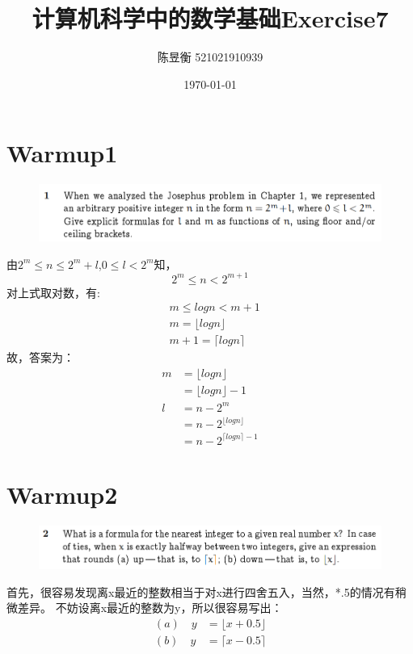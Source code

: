 \documentclass[]{article}
\title{计算机科学中的数学基础Exercise7}
\author{陈昱衡 521021910939}
\date{\today}
\begin{document}
\maketitle

\section*{Warmup1}
\begin{figure}[H]
\includegraphics[scale = 1]{Q1.png}
\end{figure}
由$2^m \le n \le 2^m + l$,$0 \le l < 2^m$知，
\begin{equation}
    2^m \le n < 2^{m+1}
\end{equation}
对上式取对数，有:
\begin{align}
    &m \le logn < m+1\\
    &m = \lfloor logn \rfloor \\
    &m + 1 =\lceil logn \rceil 
\end{align}
故，答案为：
\begin{align}
    m &= \lfloor logn \rfloor \\
        &= \lfloor logn \rfloor - 1\\
    l &= n - 2^m\\
        &= n - 2^{\lfloor logn \rfloor}\\
        &= n - 2^{\lceil logn \rceil - 1}
\end{align}



\section*{Warmup2}
\begin{figure}[H]
\includegraphics[scale = 1]{Q2.png}
\end{figure}
首先，很容易发现离x最近的整数相当于对x进行四舍五入，当然，*.5的情况有稍微差异。
不妨设离x最近的整数为y，所以很容易写出：
\begin{align}
    (a) \quad y &= \lfloor x+0.5 \rfloor\\
    (b) \quad y &= \lceil x-0.5 \rceil
\end{align}
\end{document}
